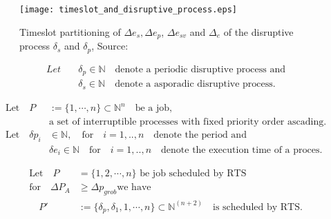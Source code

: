 \begin{figure}[h]
	\centering
	\texttt{[image: timeslot\_and\_disruptive\_process.eps]}
	\caption{Timeslot partitioning of  $\Delta e_s, \Delta e_p$, $\Delta e_{sv}$ and $\Delta_e$ of the disruptive process $\delta_s$ and $\delta_p$, Source: \cite{K}}
	\label{fig:timeslots}
\end{figure}



\begin{definition}
	\begin{subequations}     
		\begin{align} 
			Let \quad & \delta_p \in \mathbb{N} \quad \text{denote a periodic disruptive process and}\\
 	&\delta_s \in \mathbb{N} \quad \text{denote a asporadic disruptive process.}
 		\end{align}
	\end{subequations}
\end{definition}
 	
\begin{definition}
 	\begin{subequations}
 		\begin{align}
 \text{Let} \quad P& := \{1, \cdots, n \} \subset \mathbb{N}^n \quad \text{be a job,}\\
  &\text{a set of interruptible processes with fixed priority order ascading.} \\
 	\text{Let} \quad \delta p_i &\in \mathbb{N}, \quad \text{for} \quad i = 1,..,n \quad  \text{denote the period and}  \\
 	&\delta e_i  \in \mathbb{N} \quad \text{for} \quad  i = 1,..,n \quad  \text{denote the execution time of a proces}.  
 		\end{align}   
 	\end{subequations}
\end{definition}

\begin{theorem}
 	\begin{subequations}
 		\begin{align}
 		\text{Let} \quad P &=\{1, 2, \cdots,n \} \text{ be job scheduled by RTS} \\
 		\text{for} \quad \Delta P_A & \geq  \Delta p_{grob} \text{we have}\\
        \quad P' &:= \{\delta_p, \delta_1, 1, \cdots, n \} \subset \mathbb{N}^{(n+2)} \quad \text{is scheduled by RTS}.
  		\end{align}   
 	\end{subequations}
\end{theorem}

